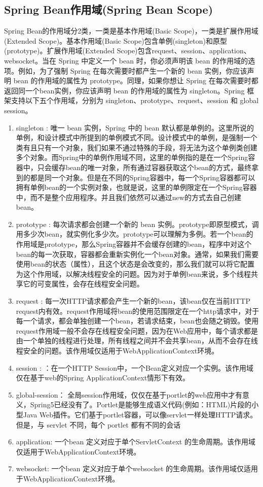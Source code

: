 \documentclass[../../../interview-questions.tex]{subfiles}
\begin{document}
\subsection{Spring Bean作用域(Spring Bean Scope)}

Spring Bean的作用域分2类，一类是基本作用域(Basic Scope)，一类是扩展作用域(Extended Scope)。基本作用域(Basic Scope)包含单例(singleton)和原型(prototype)。扩展作用域(Extended Scope)包含request、session、application、websocket。当在 Spring 中定义一个 bean 时，你必须声明该 bean 的作用域的选项。例如，为了强制 Spring 在每次需要时都产生一个新的 bean 实例，你应该声明 bean 的作用域的属性为 prototype。同理，如果你想让 Spring 在每次需要时都返回同一个bean实例，你应该声明 bean 的作用域的属性为 singleton。Spring 框架支持以下五个作用域，分别为 singleton、prototype、request、session 和 global session。

\begin{enumerate}
    \item {singleton : 唯一 bean 实例，Spring 中的 bean 默认都是单例的。}这里所说的单例，和设计模式中所提到的单例模式不同。设计模式中的单例，是强制一个类有且只有一个对象，我们如果不通过特殊的手段，将无法为这个单例类创建多个对象。而Spring中的单例作用域不同，这里的单例指的是在一个Spring容器中，只会缓存bean的唯一对象，所有通过容器获取这个bean的方式，最终拿到的都是同一个对象。但是在不同的Spring容器中，每一个Spring容器都可以拥有单例bean的一个实例对象，也就是说，这里的单例限定在一个Spring容器中，而不是整个应用程序。并且我们依然可以通过new的方式去自己创建bean。
    \item {prototype : 每次请求都会创建一个新的 bean 实例。}prototype即原型模式，调用多少次bean，就实例化多少次。prototype可以理解为多例。若一个bean的作用域是prototype，那么Spring容器并不会缓存创建的bean，程序中对这个bean的每一次获取，容器都会重新实例化一个bean对象。通常，如果我们需要使用bean的状态（属性），且这个状态是会改变的，那么我们就可以将它配置为这个作用域，以解决线程安全的问题。因为对于单例bean来说，多个线程共享它的可变属性，会存在线程安全问题。
    \item {request : 每一次HTTP请求都会产生一个新的bean，该bean仅在当前HTTP request内有效。}request作用域将bean的使用范围限定在一个http请求中，对于每一个请求，都会单独创建一个bean，若请求结束，bean也会随之销毁。使用request作用域一般不会存在线程安全问题，因为在Web应用中，每个请求都是由一个单独的线程进行处理，所有线程之间并不会共享bean，从而不会存在线程安全的问题。该作用域仅适用于WebApplicationContext环境。
    \item {session : ：在一个HTTP Session中，一个Bean定义对应一个实例。该作用域仅在基于web的Spring ApplicationContext情形下有效。}
    \item {global-session： 全局session作用域，仅仅在基于portlet的web应用中才有意义，Spring5已经没有了。Portlet是能够生成语义代码(例如：HTML)片段的小型Java Web插件。它们基于portlet容器，可以像servlet一样处理HTTP请求。但是，与 servlet 不同，每个 portlet 都有不同的会话}
    \item {application: 一个bean 定义对应于单个ServletContext 的生命周期。该作用域仅适用于WebApplicationContext环境。}
    \item {websocket: 一个bean 定义对应于单个websocket 的生命周期。该作用域仅适用于WebApplicationContext环境。}
\end{enumerate}
\end{document}
